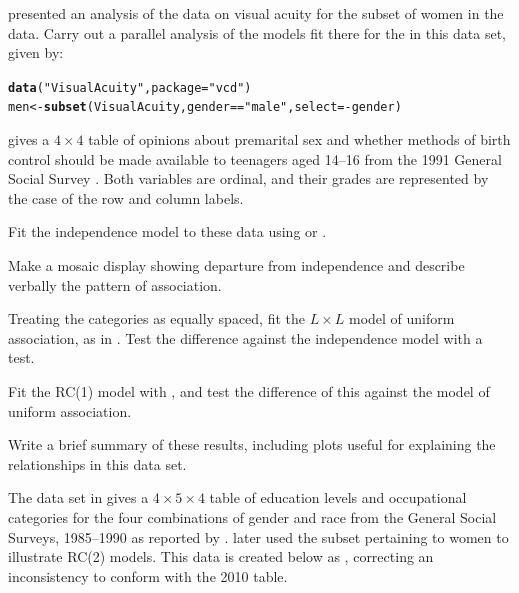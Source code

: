 \documentclass[11pt]{book}\usepackage[]{graphicx}\usepackage[]{color}
\makeatletter
\newcommand{\hlstr}[1]{\textcolor[rgb]{0.192,0.494,0.8}{#1}}%
\newcommand{\hlopt}[1]{\textcolor[rgb]{0,0,0}{#1}}%
\newcommand{\hlstd}[1]{\textcolor[rgb]{0.345,0.345,0.345}{#1}}%
\newcommand{\hlkwb}[1]{\textcolor[rgb]{0.69,0.353,0.396}{#1}}%
\newcommand{\hlkwc}[1]{\textcolor[rgb]{0.333,0.667,0.333}{#1}}%
\newcommand{\hlkwd}[1]{\textcolor[rgb]{0.737,0.353,0.396}{\textbf{#1}}}%
\newenvironment{kframe}{%
 \def\at@end@of@kframe{}%
 \ifinner\ifhmode%
  \def\at@end@of@kframe{\end{minipage}}%
  \begin{minipage}{\columnwidth}%
 \fi\fi%
 \def\FrameCommand##1{\hskip\@totalleftmargin \hskip-\fboxsep
 \colorbox{shadecolor}{##1}\hskip-\fboxsep
     \hskip-\linewidth \hskip-\@totalleftmargin \hskip\columnwidth}%
 \MakeFramed {\advance\hsize-\width
   \@totalleftmargin\z@ \linewidth\hsize
   \@setminipage}}%
 {\par\unskip\endMakeFramed%
 \at@end@of@kframe}
\newenvironment{knitrout}{}{} %
\renewenvironment{knitrout}{\small\renewcommand{\baselinestretch}{.85}}{} %
\makeatother
\begin{document}
\begin{Exercises}

  \exercise {} presented an analysis of the data on visual acuity 
  for the subset of women in the  data.  Carry out a parallel
  analysis of the models fit there for the  in this data set, given by:
\begin{knitrout}
\color{fgcolor}\begin{kframe}
\begin{alltt}
\hlkwd{data}\hlstd{(}\hlstr{"VisualAcuity"}\hlstd{,} \hlkwc{package}\hlstd{=}\hlstr{"vcd"}\hlstd{)}
\hlstd{men} \hlkwb{<-} \hlkwd{subset}\hlstd{(VisualAcuity, gender}\hlopt{==}\hlstr{"male"}\hlstd{,} \hlkwc{select}\hlstd{=}\hlopt{-}\hlstd{gender)}
\end{alltt}
\end{kframe}
\end{knitrout}


  \exercise {} gives a $4 \times 4$ table of opinions about
  premarital sex and whether methods of birth control should be made available
  to teenagers aged 14--16 from the 1991 General Social Survey
  \citep[Table 10.3]{Agresti:2013}.  Both variables are ordinal, and their
  grades are represented by the case of the row and column labels.


  \begin{enumerate*}
    \item Fit the independence model to these data using  or .
    \item Make a mosaic display showing departure from independence and describe
    verbally the pattern of association.
    \item Treating the categories as equally spaced, fit the $L \times L$ model
    of uniform association, as in .  Test the
    difference against the independence model with a \LR test.
    \item Fit the RC(1) model with , and test the difference of
    this against the model of uniform association.
    \item Write a brief summary of these results, including plots useful
    for explaining the relationships in this data set.
  \end{enumerate*}
  
  \exercise The data set  in  gives a $4 \times 5 \times 4$
  table of education levels and occupational categories for the four combinations
  of gender and race from the General Social Surveys, 1985--1990 as reported by
  \citet[Table 2]{Wong:2001}. \citet[Table 2.3B]{Wong:2010} later used the
  subset pertaining to women to illustrate RC(2) models.  This data is
  created below as , correcting an inconsistency to conform with
  the 2010 table.
  


\end{Exercises}
\end{document}
